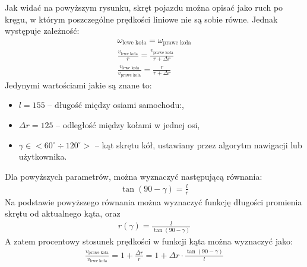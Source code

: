         Jak widać na powyższym rysunku, skręt pojazdu można opisać jako ruch po kręgu, w którym poszczególne prędkości liniowe nie są sobie równe.
        Jednak występuje zależność:
        \begin{gather}
            \omega_{\text{lewe koła}} = \omega_{\text{prawe koła}}\\
            \frac{v_{\text{lewe koła}}}{r} = \frac{v_{\text{prawe koła}}}{r + \Delta r}\\
            \frac{v_\text{lewe koła}}{v_{\text{prawe koła}}} = \frac{r}{r + \Delta r}
        \end{gather}
        Jedynymi wartościami jakie są znane to:
        \begin{itemize}
            \item $l = 155$ -- długość między osiami samochodu:,
            \item $\Delta r = 125$ -- odległość między kołami w jednej osi,
            \item $\gamma \in <60^\circ \div 120^\circ>$ -- kąt skrętu kół, ustawiany przez algorytm nawigacji lub użytkownika.
        \end{itemize}
        Dla powyższych parametrów, można wyznaczyć następującą równania:
        \begin{gather}
            \tan \left(90 - \gamma\right) = \frac{l}{r}
        \end{gather}
        Na podstawie powyższego równania można wyznaczyć funkcję długości promienia skrętu od aktualnego kąta, oraz 
        \begin{gather}
            r(\gamma) = \frac{l}{\tan(90-\gamma)}
            \label{eq:turning_radius}
        \end{gather}
        A zatem procentowy stosunek prędkości w funkcji kąta można wyznaczyć jako:
        \begin{gather}
            \frac{v_{\text{prawe koła}}}{v_{\text{lewe koła}}} = 1 + \frac{\Delta r}{r} = 1 + \Delta r \cdot \frac{\tan(90 - \gamma)}{l}
        \end{gather}
